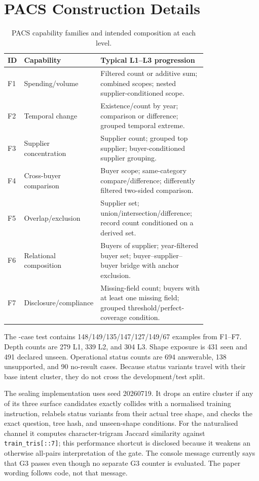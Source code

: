\section{PACS Construction Details}
\label{app:pacs}

\begin{table}[h]
  \caption{PACS capability families and intended composition at each level.}
  \centering
  \scriptsize
  \begin{tabular}{lp{0.23\linewidth}p{0.55\linewidth}}
    \toprule
    ID & Capability & Typical L1--L3 progression \\
    \midrule
    F1 & Spending/volume & Filtered count or additive sum; combined scopes; nested
    supplier-conditioned scope. \\
    F2 & Temporal change & Existence/count by year; comparison or difference; grouped temporal
    extreme. \\
    F3 & Supplier concentration & Supplier count; grouped top supplier; buyer-conditioned
    supplier grouping. \\
    F4 & Cross-buyer comparison & Buyer scope; same-category compare/difference; differently
    filtered two-sided comparison. \\
    F5 & Overlap/exclusion & Supplier set; union/intersection/difference; record count conditioned
    on a derived set. \\
    F6 & Relational composition & Buyers of supplier; year-filtered buyer set; buyer--supplier--
    buyer bridge with anchor exclusion. \\
    F7 & Disclosure/compliance & Missing-field count; buyers with at least one missing field;
    grouped threshold/perfect-coverage condition. \\
    \bottomrule
  \end{tabular}
\end{table}

The \PacsN{}-case test contains 148/149/135/147/127/149/67 examples from F1--F7.  Depth counts are
279 L1, 339 L2, and 304 L3.  Shape exposure is 431 seen and 491 declared unseen.  Operational
status counts are 694 answerable, 138 unsupported, and 90 no-result cases.  Because status
variants travel with their base intent cluster, they do not cross the development/test split.

The sealing implementation uses seed 20260719.  It drops an entire cluster if any of its three
surface candidates exactly collides with a normalised training instruction, relabels status
variants from their actual tree shape, and checks the exact question, tree hash, and unseen-shape
conditions.  For the naturalised channel it computes character-trigram Jaccard similarity
against \texttt{train\_tris[::7]}; this performance shortcut is disclosed because it weakens an
otherwise all-pairs interpretation of the gate.  The console message currently says that G3
passes even though no separate G3 counter is evaluated.  The paper wording follows code, not
that message.


